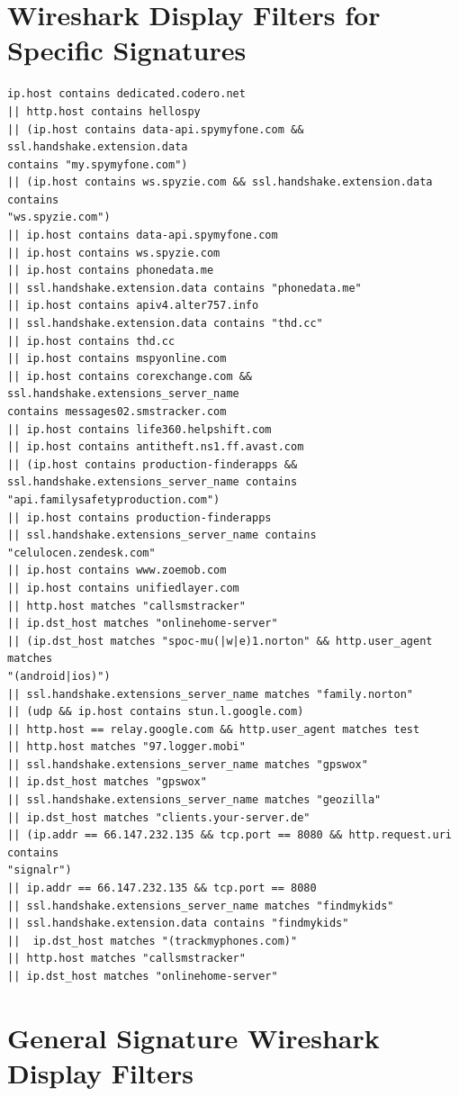 \documentclass[acmtog]{acmart}
\begin{document}
\section{Wireshark Display Filters for Specific Signatures}
\begin{lstlisting}
ip.host contains dedicated.codero.net 
|| http.host contains hellospy
|| (ip.host contains data-api.spymyfone.com && ssl.handshake.extension.data 
contains "my.spymyfone.com") 
|| (ip.host contains ws.spyzie.com && ssl.handshake.extension.data contains 
"ws.spyzie.com") 
|| ip.host contains data-api.spymyfone.com 
|| ip.host contains ws.spyzie.com 
|| ip.host contains phonedata.me 
|| ssl.handshake.extension.data contains "phonedata.me" 
|| ip.host contains apiv4.alter757.info 
|| ssl.handshake.extension.data contains "thd.cc" 
|| ip.host contains thd.cc 
|| ip.host contains mspyonline.com 
|| ip.host contains corexchange.com && ssl.handshake.extensions_server_name 
contains messages02.smstracker.com 
|| ip.host contains life360.helpshift.com 
|| ip.host contains antitheft.ns1.ff.avast.com 
|| (ip.host contains production-finderapps && 
ssl.handshake.extensions_server_name contains "api.familysafetyproduction.com") 
|| ip.host contains production-finderapps 
|| ssl.handshake.extensions_server_name contains "celulocen.zendesk.com" 
|| ip.host contains www.zoemob.com 
|| ip.host contains unifiedlayer.com 
|| http.host matches "callsmstracker" 
|| ip.dst_host matches "onlinehome-server" 
|| (ip.dst_host matches "spoc-mu(|w|e)1.norton" && http.user_agent matches 
"(android|ios)")
|| ssl.handshake.extensions_server_name matches "family.norton" 
|| (udp && ip.host contains stun.l.google.com) 
|| http.host == relay.google.com && http.user_agent matches test 
|| http.host matches "97.logger.mobi" 
|| ssl.handshake.extensions_server_name matches "gpswox" 
|| ip.dst_host matches "gpswox" 
|| ssl.handshake.extensions_server_name matches "geozilla" 
|| ip.dst_host matches "clients.your-server.de" 
|| (ip.addr == 66.147.232.135 && tcp.port == 8080 && http.request.uri contains 
"signalr") 
|| ip.addr == 66.147.232.135 && tcp.port == 8080 
|| ssl.handshake.extensions_server_name matches "findmykids" 
|| ssl.handshake.extension.data contains "findmykids"  
||  ip.dst_host matches "(trackmyphones.com)" 
|| http.host matches "callsmstracker" 
|| ip.dst_host matches "onlinehome-server" 
\end{lstlisting}

\section{General Signature Wireshark Display Filters}
\end{document}
